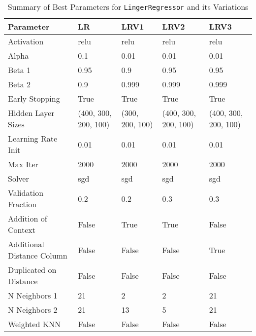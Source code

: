\documentclass[a4paper, 12pt]{report}
\begin{document}
\begin{table}[h]
    \centering
    \caption{Summary of Best Parameters for \texttt{LingerRegressor} and its Variations}
    \label{tab:best_parameters_summary_exp6}
    \footnotesize
    \begin{tabular}{|l|l|l|l|l|}
    \hline
    Parameter & LR & LRV1 & LRV2 & LRV3 \\
    \hline
    Activation & relu & relu & relu & relu \\
    Alpha & 0.1 & 0.01 & 0.01 & 0.01 \\
    Beta 1 & 0.95 & 0.9 & 0.95 & 0.95 \\
    Beta 2 & 0.9 & 0.999 & 0.999 & 0.999 \\
    Early Stopping & True & True & True & True \\
    Hidden Layer Sizes & (400, 300, 200, 100) & (300, 200, 100) & (400, 300, 200, 100) & (400, 300, 200, 100) \\
    Learning Rate Init & 0.01 & 0.01 & 0.01 & 0.01 \\
    Max Iter & 2000 & 2000 & 2000 & 2000 \\
    Solver & sgd & sgd & sgd & sgd \\
    Validation Fraction & 0.2 & 0.2 & 0.3 & 0.3 \\
    Addition of Context & False & True & True & False \\
    Additional Distance Column & False & False & False & True \\
    Duplicated on Distance & False & False & False & False \\
    N Neighbors 1 & 21 & 2 & 2 & 21 \\
    N Neighbors 2 & 21 & 13 & 5 & 21 \\
    Weighted KNN & False & False & False & False \\
    \hline
    \end{tabular}
\end{table}
\clearpage
\end{document}

